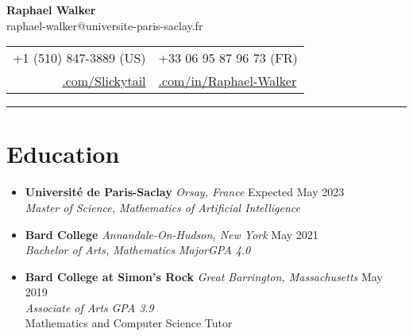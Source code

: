 \documentclass[12pt,letterpaper]{article}
\begin{document}
\begin{center}
	{\LARGE{\textbf{Raphael Walker}}}\\[0.05in]
        raphael-walker@universite-paris-saclay.fr\\[0.04in]
	\begin{tabular}{r @{\hskip 0.1in}|@{\hskip 0.1in} l}
        +1 (510) 847-3889 (US) & +33 06 95 87 96 73 (FR)\\
		\href{https://github.com/Slickytail}{\faGithub.com/Slickytail} &
		\href{https://linkedin.com/in/raphael-walker}{\faLinkedinSquare.com/in/Raphael-Walker}
	\end{tabular}
\end{center}
\hrule \vspace{-0.5em}

\section*{Education} \vspace{-0.5em}
\begin{itemize}[label=,itemsep=0pt]
    \item
    \textbf{Université de Paris-Saclay} \textit{Orsay, France} \hfill Expected May 2023\\
    \textit{Master of Science, Mathematics of Artificial Intelligence}
	\item
	\textbf{Bard College} \textit{Annandale-On-Hudson, New York} \hfill May 2021\\
    \textit{Bachelor of Arts, Mathematics Major}\hfill \textit{GPA 4.0}
	\item
	\textbf{Bard College at Simon's Rock} \textit{Great Barrington, Massachusetts} \hfill May 2019\\
	\textit{Associate of Arts} \hfill \textit{GPA 3.9}\\
	Mathematics and Computer Science Tutor
\end{itemize}
\vspace{-2em}
\end{document}
